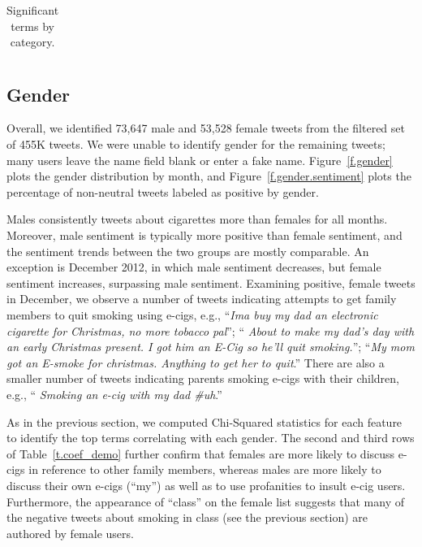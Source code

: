 \documentclass{sig-alternate}
\begin{document}
\begin{table}[t]
\centering
\caption{Significant terms by category. \label{t.coef_demo}}
\label{tab:terms}
\begin{tabular}{|r|p{14cm}| }
\hline

\hline
\end{tabular}
\end{table}


\subsection{Gender}

Overall, we identified 73,647 male and 53,528 female tweets from the filtered
set of 455K tweets. We were unable to identify gender for the remaining
tweets; many users leave the name field blank or enter a fake
name. Figure~\ref{f.gender} plots the gender distribution by month, and
Figure~\ref{f.gender.sentiment} plots the percentage of non-neutral tweets
labeled as positive by gender.

Males consistently tweets about cigarettes more than females for all
months. Moreover, male sentiment is typically more positive than female
sentiment, and the sentiment trends between the two groups are mostly
comparable. An exception is December 2012, in which male sentiment decreases,
but female sentiment increases, surpassing male sentiment. Examining positive,
female tweets in December, we observe a number of tweets indicating attempts
to get family members to quit smoking using e-cigs, e.g., ``{\sl Ima buy my
  dad an electronic cigarette for Christmas, no more tobacco pal}''; ``{\sl
  About to make my dad's day with an early Christmas present. I got him an
  E-Cig so he'll quit smoking.}''; ``{\sl My mom got an E-smoke for
  christmas. Anything to get her to quit}.'' There are also a smaller number
of tweets indicating parents smoking e-cigs with their children, e.g., ``{\sl
  Smoking an e-cig with my dad \#uh}.''

As in the previous section, we computed Chi-Squared statistics for each feature
to identify the top terms correlating with each gender. The second and third
rows of Table~\ref{t.coef_demo} further confirm that females are more likely
to discuss e-cigs in reference to other family members, whereas males are more
likely to discuss their own e-cigs (``my'') as well as to use profanities to
insult e-cig users. Furthermore, the appearance of ``class'' on the female
list suggests that many of the negative tweets about smoking in class (see the
previous section) are authored by female users.
\end{document}
